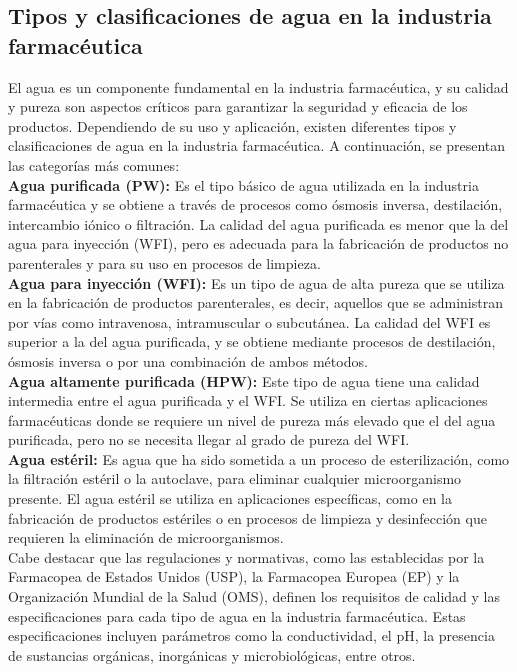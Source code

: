 \subsection{Tipos y clasificaciones de agua en la industria farmacéutica}

El agua es un componente fundamental en la industria farmacéutica, y su calidad y pureza son aspectos críticos para garantizar la seguridad y eficacia de los productos. Dependiendo de su uso y aplicación, existen diferentes tipos y clasificaciones de agua en la industria farmacéutica. A continuación, se presentan las categorías más comunes:\\

\textbf{Agua purificada (PW):} Es el tipo básico de agua utilizada en la industria farmacéutica y se obtiene a través de procesos como ósmosis inversa, destilación, intercambio iónico o filtración. La calidad del agua purificada es menor que la del agua para inyección (WFI), pero es adecuada para la fabricación de productos no parenterales y para su uso en procesos de limpieza.\\

\textbf{Agua para inyección (WFI):} Es un tipo de agua de alta pureza que se utiliza en la fabricación de productos parenterales, es decir, aquellos que se administran por vías como intravenosa, intramuscular o subcutánea. La calidad del WFI es superior a la del agua purificada, y se obtiene mediante procesos de destilación, ósmosis inversa o por una combinación de ambos métodos.\\

\textbf{Agua altamente purificada (HPW):} Este tipo de agua tiene una calidad intermedia entre el agua purificada y el WFI. Se utiliza en ciertas aplicaciones farmacéuticas donde se requiere un nivel de pureza más elevado que el del agua purificada, pero no se necesita llegar al grado de pureza del WFI.\\

\textbf{Agua estéril:} Es agua que ha sido sometida a un proceso de esterilización, como la filtración estéril o la autoclave, para eliminar cualquier microorganismo presente. El agua estéril se utiliza en aplicaciones específicas, como en la fabricación de productos estériles o en procesos de limpieza y desinfección que requieren la eliminación de microorganismos.\\

Cabe destacar que las regulaciones y normativas, como las establecidas por la Farmacopea de Estados Unidos (USP), la Farmacopea Europea (EP) y la Organización Mundial de la Salud (OMS), definen los requisitos de calidad y las especificaciones para cada tipo de agua en la industria farmacéutica. Estas especificaciones incluyen parámetros como la conductividad, el pH, la presencia de sustancias orgánicas, inorgánicas y microbiológicas, entre otros.\\

